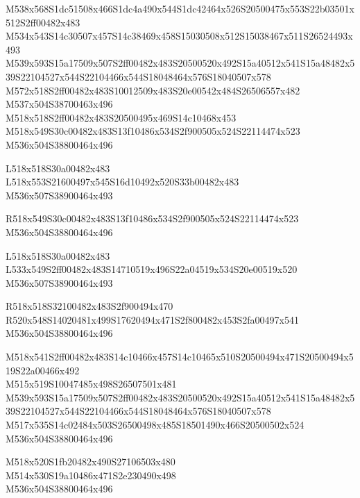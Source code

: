 \documentclass{article}
\begin{document}
\begin{multicols}{5}
\begin{center}
M538x568S1dc51508x466S1dc4a490x544S1dc42464x526S20500475x553S22b03501x512S2ff00482x483 %
\\M534x543S14c30507x457S14c38469x458S15030508x512S15038467x511S26524493x493 %
\\M539x593S15a17509x507S2ff00482x483S20500520x492S15a40512x541S15a48482x539S22104527x544S22104466x544S18048464x576S18040507x578 %
\\M572x518S2ff00482x483S10012509x483S20e00542x484S26506557x482 %
\\M537x504S38700463x496 %
\\M518x518S2ff00482x483S20500495x469S14c10468x453 %
\\M518x549S30c00482x483S13f10486x534S2f900505x524S22114474x523 %
\\M536x504S38800464x496 %

L518x518S30a00482x483 %
\\L518x553S21600497x545S16d10492x520S33b00482x483 %
\\M536x507S38900464x493 %

R518x549S30c00482x483S13f10486x534S2f900505x524S22114474x523 %
\\M536x504S38800464x496 %

L518x518S30a00482x483 %
\\L533x549S2ff00482x483S14710519x496S22a04519x534S20e00519x520 %
\\M536x507S38900464x493 %

R518x518S32100482x483S2f900494x470 %
\\R520x548S14020481x499S17620494x471S2f800482x453S2fa00497x541 %
\\M536x504S38800464x496 %

M518x541S2ff00482x483S14c10466x457S14c10465x510S20500494x471S20500494x519S22a00466x492 %
\\M515x519S10047485x498S26507501x481 %
\\M539x593S15a17509x507S2ff00482x483S20500520x492S15a40512x541S15a48482x539S22104527x544S22104466x544S18048464x576S18040507x578 %
\\M517x535S14c02484x503S26500498x485S18501490x466S20500502x524 %
\\M536x504S38800464x496 %

M518x520S1fb20482x490S27106503x480 %
\\M514x530S19a10486x471S2e230490x498 %
\\M536x504S38800464x496 %


\end{center}
\end{multicols}
\end{document}
